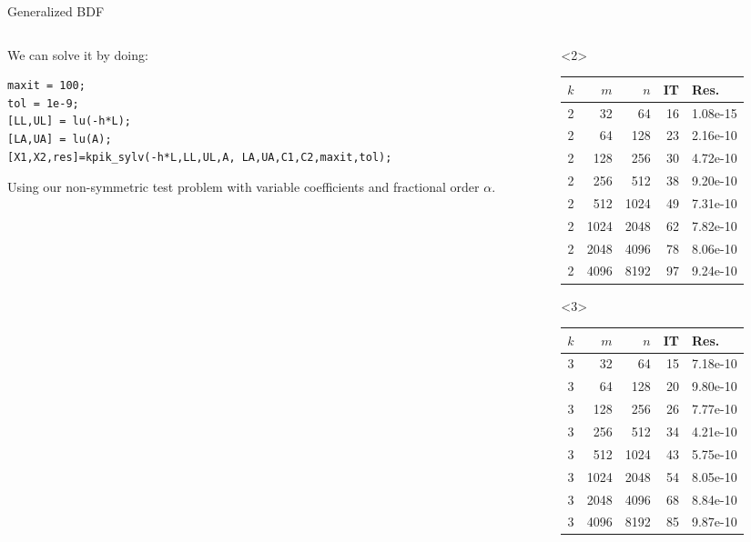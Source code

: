 \documentclass[aspectratio=169,xcolor=dvipsnames]{beamer}
\begin{document}
\begin{frame}[fragile]{Generalized BDF}

\begin{columns}
\begin{column}{0.49\columnwidth}
We can solve it by doing:	
	
\begin{verbatim}
maxit = 100;
tol = 1e-9;
[LL,UL] = lu(-h*L);
[LA,UA] = lu(A);
[X1,X2,res]=kpik_sylv(-h*L,LL,UL,A, LA,UA,C1,C2,maxit,tol);
\end{verbatim}
Using our non-symmetric test problem with variable coefficients and fractional order $\alpha$.

\end{column}
\begin{column}{0.49\columnwidth}\centering
\begin{onlyenv}<2>
\begin{tabular}{crrrl}
\toprule
$k$ & $m$ & $n$ & IT & Res. \\
\midrule
2 & 32 & 64 & 16 & 1.08e-15\\
2 & 64 & 128 & 23 & 2.16e-10\\
2 & 128 & 256 & 30 & 4.72e-10\\
2 & 256 & 512 & 38 & 9.20e-10\\
2 & 512 & 1024 & 49 & 7.31e-10\\
2 & 1024 & 2048 & 62 & 7.82e-10\\
2 & 2048 & 4096 & 78 & 8.06e-10\\
2 & 4096 & 8192 & 97 & 9.24e-10\\
\bottomrule
\end{tabular}
\end{onlyenv}
\begin{onlyenv}<3>
	\begin{tabular}{crrrl}
		\toprule
		$k$ & $m$ & $n$ & IT & Res. \\
		\midrule
3 & 32 & 64 & 15 & 7.18e-10\\
3 & 64 & 128 & 20 & 9.80e-10\\
3 & 128 & 256 & 26 & 7.77e-10\\
3 & 256 & 512 & 34 & 4.21e-10\\
3 & 512 & 1024 & 43 & 5.75e-10\\
3 & 1024 & 2048 & 54 & 8.05e-10\\
3 & 2048 & 4096 & 68 & 8.84e-10\\
3 & 4096 & 8192 & 85 & 9.87e-10\\

\end{tabular}
\end{onlyenv}
\end{column}
\end{columns}
\end{frame}
\end{document}
